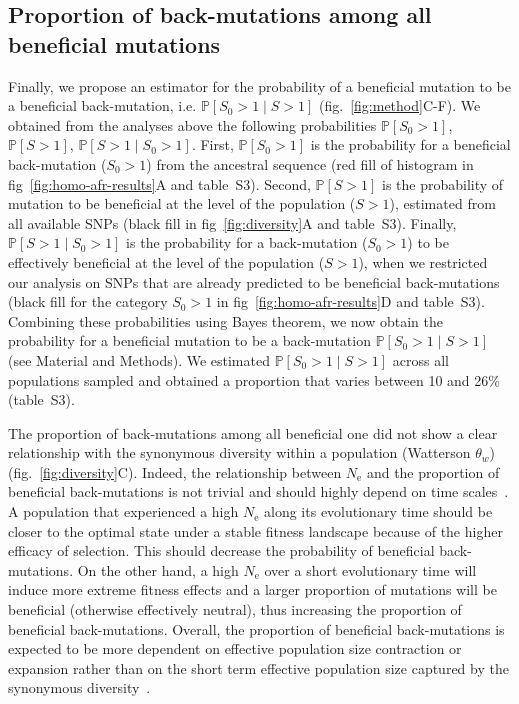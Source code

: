 \documentclass{article}
\newcommand{\Ne}{N_{\textrm{e}}}
\newcommand{\Sphy}{S_{0}}
\newcommand{\given}{\mid}
\newcommand{\Spop}{S}
\begin{document}
    \subsection*{Proportion of back-mutations among all beneficial mutations}

    Finally, we propose an estimator for the probability of a beneficial mutation to be a beneficial back-mutation, i.e. $\mathbb{P} [ \Sphy > 1  \given  \Spop > 1]$ (fig.~\ref{fig:method}C-F).
    We obtained from the analyses above the following probabilities $\mathbb{P} [ \Sphy > 1 ]$, $\mathbb{P} [ \Spop > 1 ]$, $\mathbb{P} [ \Spop > 1  \given  \Sphy > 1]$.
    First, $\mathbb{P} [ \Sphy > 1 ]$ is the probability for a beneficial back-mutation ($\Sphy > 1$) from the ancestral sequence (red fill of histogram in fig~\ref{fig:homo-afr-results}A and table~S3).
    Second, $\mathbb{P} [ \Spop > 1 ]$ is the probability of mutation to be beneficial at the level of the population ($\Spop > 1$), estimated from all available SNPs (black fill in fig~\ref{fig:diversity}A and table~S3).
    Finally, $\mathbb{P} [ \Spop > 1  \given  \Sphy > 1]$ is the probability for a back-mutation ($\Sphy > 1$) to be effectively beneficial at the level of the population ($\Spop > 1$), when we restricted our analysis on SNPs that are already predicted to be beneficial back-mutations (black fill for the category $\Sphy > 1$ in fig~\ref{fig:homo-afr-results}D and table~S3).
    Combining these probabilities using Bayes theorem, we now obtain the probability for a beneficial mutation to be a back-mutation $\mathbb{P} [ \Sphy > 1  \given  \Spop > 1]$ (see Material and Methods).
    We estimated $\mathbb{P} [ \Sphy > 1  \given  \Spop > 1]$ across all populations sampled and obtained a proportion that varies between 10 and 26\% (table~S3).

    The proportion of back-mutations among all beneficial one did not show a clear relationship with the synonymous diversity within a population (Watterson $\theta_w$) (fig.~\ref{fig:diversity}C).
    Indeed, the relationship between $\Ne$ and the proportion of beneficial back-mutations is not trivial and should highly depend on time scales~\cite{charlesworth_other_2007}.
    A population that experienced a high $\Ne$ along its evolutionary time should be closer to the optimal state under a stable fitness landscape because of the higher efficacy of selection.
    This should decrease the probability of beneficial back-mutations.
    On the other hand, a high $\Ne$ over a short evolutionary time will induce more extreme fitness effects and a larger proportion of mutations will be beneficial (otherwise effectively neutral), thus increasing the proportion of beneficial back-mutations.
    Overall, the proportion of beneficial back-mutations is expected to be more dependent on effective population size contraction or expansion rather than on the short term effective population size captured by the synonymous diversity~\cite{charlesworth_other_2007}.
\end{document}
